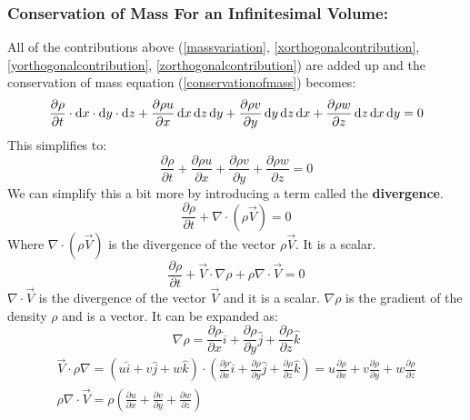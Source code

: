 \documentclass[class=report, crop=false, 12pt,a4paper]{standalone}
\begin{document}
\subsubsection{Conservation of Mass For an Infinitesimal Volume:}
All of the contributions above (\ref{massvariation}, \ref{xorthogonalcontribution}, \ref{yorthogonalcontribution}, \ref{zorthogonalcontribution}) are added up and the conservation of mass equation (\ref{conservationofmass}) becomes:
\begin{gather}
  \frac{\partial \rho}{\partial t} \cdot\dif x \cdot \dif y \cdot \dif z + \frac{\partial \rho u}{\partial x} \dif x \dif z \dif y + \frac{\partial \rho v}{\partial y} \dif y \dif z \dif x + \frac{\partial \rho w}{\partial z} \dif z \dif x \dif y = 0
\end{gather}
This simplifies to:
\begin{equation}
  \frac{\partial \rho}{\partial t} + \frac{\partial \rho u}{\partial x} + \frac{\partial \rho v}{\partial y} + \frac{\partial \rho w}{\partial z} = 0
\end{equation}
We can simplify this a bit more by introducing a term called the \textbf{divergence}.
\begin{equation}
  \frac{\partial \rho}{\partial t} + \nabla \cdot (\rho \vec{V}) = 0
\end{equation}
Where $\nabla \cdot (\rho \vec{V})$ is the divergence of the vector $\rho \vec{V}$. It is a scalar.
\begin{equation}
  \frac{\partial \rho}{\partial t} + \vec{V}\cdot \nabla \rho + \rho \nabla \cdot \vec{V} = 0
\end{equation}
$\nabla \cdot \vec{V}$ is the divergence of the vector $\vec{V}$ and it is a scalar. $\nabla \rho$ is the gradient of the density $\rho$ and is a vector. It can be expanded as:
\begin{equation}
  \nabla \rho = \frac{\partial \rho}{\partial x} \hat{i} + \frac{\partial \rho}{\partial y} \hat{j} + \frac{\partial \rho}{\partial z} \hat{k}
\end{equation}
\begin{gather}
  \vec{V} \cdot \rho \nabla = (u \hat{i} + v \hat{j} + w \hat{k}) \cdot \left( \frac{\partial \rho}{\partial x} \hat{i} + \frac{\partial \rho}{\partial y} \hat{j} + \frac{\partial \rho}{\partial z} \hat{k} \right) = u \frac{\partial \rho}{\partial x} + v \frac{\partial \rho}{\partial y} + w \frac{\partial \rho}{\partial z}\\
  \rho \nabla \cdot \vec{V} = \rho \left( \frac{\partial u}{\partial x} + \frac{\partial v}{\partial y} + \frac{\partial w}{\partial z} \right)
\end{gather}
\end{document}
